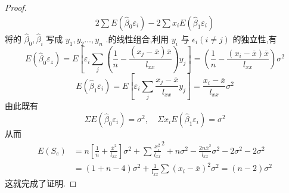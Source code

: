 \begin{proof}{}{}
\[\begin{array}{c}
	{2 \sum E\left(\hat{\beta}_{0} \varepsilon_{i}\right)-2 \sum x_{i} E\left(\hat{\beta}_{1} \varepsilon_{i}\right)}\end{array}
	\]
	将的 $ \hat{\beta}_0,\hat{\beta}_i $ 写成 $ y_1,y_2…,y_n $ .的线性组合,利用 $ y_i $ 与 $ \epsilon_i(i\neq j) $ 的独立性,有
	\[
	E\left(\hat{\beta}_{0} \varepsilon_{z}\right)=E\left[\varepsilon_{i} \sum_{j}\left(\frac{1}{n}-\frac{\left(x_{j}-\overline{x}\right) \overline{x}}{l_{x x}}\right) y_{j}\right]=\left(\frac{1}{n}-\frac{\left(x_{i}-\overline{x}\right) \overline{x}}{l_{x x}}\right) \sigma^{2}
	\]
	\[
	E\left(\hat{\beta}_{1} \varepsilon_{i}\right)=E\left[\varepsilon_{i} \sum_{j} \frac{x_{j}-\overline{x}}{l_{x x}} y_{j}\right]=\frac{x_{i}-\overline{x}}{l_{x x}} \sigma^{2}
	\]
	由此既有
	\[
	\Sigma E\left(\hat{\beta}_{0} \varepsilon_{i}\right)=\sigma^{2}, \quad \Sigma x_{i} E\left(\hat{\beta}_{1} \varepsilon_{i}\right)=\sigma^{2}
	\]
	从而
	\[
	\begin{aligned} E\left(S_{e}\right) &=n\left[\frac{1}{n}+\frac{\overline{x}^{2}}{l_{x x}}\right] \sigma^{2}+\sum \frac{x_{i}^{2}}{l_{x x}}^{2}+n \sigma^{2}-\frac{2 n \overline{x}^{2}}{l_{x x}} \sigma^{2}-2 \sigma^{2}-2 \sigma^{2} \\ &=(1+n-4) \sigma^{2}+\frac{1}{l_{x x}} \sum\left(x_{i}-\overline{x}\right)^{2} \sigma^{2}=(n-2) \sigma^{2} \end{aligned}
	\]
	这就完成了证明.
\end{proof}

